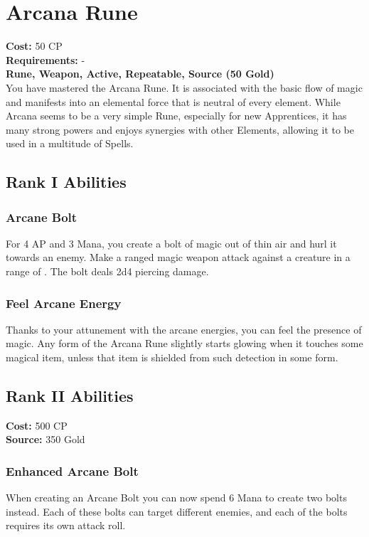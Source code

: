 \section{Arcana Rune}\label{rune:arcana}
\textbf{Cost:} 50 CP\\
\textbf{Requirements:} -\\
\textbf{Rune, Weapon, Active, Repeatable, Source (50 Gold)}\\
You have mastered the Arcana Rune.
It is associated with the basic flow of magic and manifests into an elemental force that is neutral of every element.
While Arcana seems to be a very simple Rune, especially for new Apprentices, it has many strong powers and enjoys synergies with other Elements, allowing it to be used in a multitude of Spells.\\

\subsection{Rank I Abilities}

\subsubsection{Arcane Bolt}
For 4 AP and 3 Mana, you create a bolt of magic out of thin air and hurl it towards an enemy.
Make a ranged magic weapon attack against a creature in a range of .
The bolt deals 2d4 piercing damage.

\subsubsection{Feel Arcane Energy}
Thanks to your attunement with the arcane energies, you can feel the presence of magic.
Any form of the Arcana Rune slightly starts glowing when it touches some magical item, unless that item is shielded from such detection in some form.

\subsection{Rank II Abilities}
\textbf{Cost:} 500 CP\\
\textbf{Source:} 350 Gold
\subsubsection{Enhanced Arcane Bolt}
When creating an Arcane Bolt you can now spend 6 Mana to create two bolts instead.
Each of these bolts can target different enemies, and each of the bolts requires its own attack roll.

